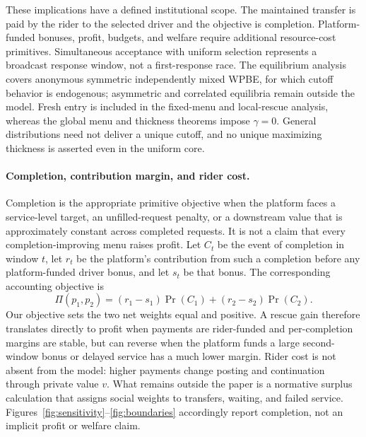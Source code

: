 \documentclass[mnsc,blindrev]{informs3}
\begin{document}
These implications have a defined institutional scope.  The maintained
transfer is paid by the rider to the selected driver and the objective is
completion.  Platform-funded bonuses, profit, budgets, and welfare require
additional resource-cost primitives.  Simultaneous acceptance with uniform
selection represents a broadcast response window, not a first-response race.
The equilibrium analysis covers anonymous symmetric independently mixed WPBE,
for which cutoff behavior is endogenous; asymmetric and correlated equilibria
remain outside the model.  Fresh entry is included in the fixed-menu and
local-rescue analysis, whereas the global menu and thickness theorems impose
$\gamma=0$.  General distributions need not deliver a unique cutoff, and no
unique maximizing thickness is asserted even in the uniform core.

\paragraph{Completion, contribution margin, and rider cost.}
Completion is the appropriate primitive objective when the platform faces a
service-level target, an unfilled-request penalty, or a downstream value that
is approximately constant across completed requests.  It is not a claim that
every completion-improving menu raises profit.  Let $C_t$ be the event of
completion in window $t$, let $r_t$ be the platform's contribution from such
a completion before any platform-funded driver bonus, and let $s_t$ be that
bonus.  The corresponding accounting objective is
\[
 \Pi(p_1,p_2)=(r_1-s_1)\Pr(C_1)+(r_2-s_2)\Pr(C_2).
\]
Our objective sets the two net weights equal and positive.  A rescue gain
therefore translates directly to profit when payments are rider-funded and
per-completion margins are stable, but can reverse when the platform funds a
large second-window bonus or delayed service has a much lower margin.  Rider
cost is not absent from the model: higher payments change posting and
continuation through private value $v$.  What remains outside the paper is a
normative surplus calculation that assigns social weights to transfers,
waiting, and failed service.  Figures~\ref{fig:sensitivity}--\ref{fig:boundaries}
accordingly report completion, not an implicit profit or welfare claim.
\end{document}
